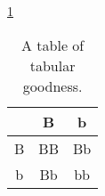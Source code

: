 \documentclass[letterpaper,12pt]{article}
\begin{document}




\ref{tab:magic}
\begin{table}
	\caption{\label{tab:magic} A table of tabular goodness.}
	\begin{center}
		\begin{tabular}{|c|c|c|}
			\hline
			& B & b \\
			\hline
			B & BB & Bb \\
			\hline
			b & Bb & bb \\
			\hline
		\end{tabular}
	\end{center}
\end{table}
\end{document}
